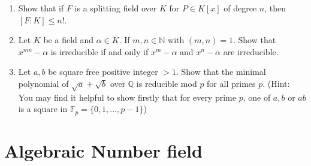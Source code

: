 \begin{enumerate}
\item Show that if $F$ is a splitting field over $K$ for $P \in K[x]$ of degree $n$, then $[F:K] \le n!$.
\item Let $K$ be a field and $\alpha \in K$. If $m,n \in \mathbb{N}$ with $(m,n)=1$. Show that $x^{mn}-\alpha$
    is irreducible if and only if $x^m -\alpha $ and $x^n-\alpha$ are irreducible.
\item Let $a,b$ be square free positive integer $>1$. Show that the minimal polynomial of $\sqrt{a}+\sqrt{b}$ over $\mathbb{Q}$ is reducible mod $p$ for all primes $p$. (Hint: You may find it helpful to show firstly that for every prime $p$, one of $a,b$ or $ab$ is a square in $\mathbb{F}_p=\{0,1,\ldots,p-1\}$)
\end{enumerate}




\section{Algebraic Number field}
